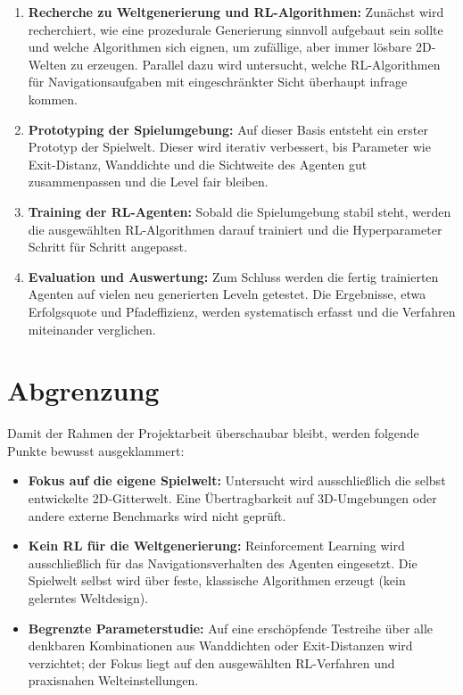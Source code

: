 \documentclass[
  a4paper,
  11pt,
  twoside,
  BCOR=8mm,           %
  headings=big,
  numbers=noenddot,
  listof=totoc,       %
  captions=tableheading,
]{scrreprt}
\begin{document}
\begin{enumerate}
    \item \textbf{Recherche zu Weltgenerierung und RL-Algorithmen:} Zunächst wird recherchiert, wie eine prozedurale Generierung sinnvoll aufgebaut sein sollte und welche Algorithmen sich eignen, um zufällige, aber immer lösbare 2D-Welten zu erzeugen. Parallel dazu wird untersucht, welche RL-Algorithmen für Navigationsaufgaben mit eingeschränkter Sicht überhaupt infrage kommen.
    \item \textbf{Prototyping der Spielumgebung:} Auf dieser Basis entsteht ein erster Prototyp der Spielwelt. Dieser wird iterativ verbessert, bis Parameter wie Exit-Distanz, Wanddichte und die Sichtweite des Agenten gut zusammenpassen und die Level fair bleiben.
    \item \textbf{Training der RL-Agenten:} Sobald die Spielumgebung stabil steht, werden die ausgewählten RL-Algorithmen darauf trainiert und die Hyperparameter Schritt für Schritt angepasst.
    \item \textbf{Evaluation und Auswertung:} Zum Schluss werden die fertig trainierten Agenten auf vielen neu generierten Leveln getestet. Die Ergebnisse, etwa Erfolgsquote und Pfadeffizienz, werden systematisch erfasst und die Verfahren miteinander verglichen.
\end{enumerate}

\section{Abgrenzung}
\label{sec:abgrenzung}

Damit der Rahmen der Projektarbeit überschaubar bleibt, werden folgende Punkte bewusst ausgeklammert:

\begin{itemize}
    \item \textbf{Fokus auf die eigene Spielwelt:} Untersucht wird ausschließlich die selbst entwickelte 2D-Gitterwelt. Eine Übertragbarkeit auf 3D-Umgebungen oder andere externe Benchmarks wird nicht geprüft.
    \item \textbf{Kein RL für die Weltgenerierung:} Reinforcement Learning wird ausschließlich für das Navigationsverhalten des Agenten eingesetzt. Die Spielwelt selbst wird über feste, klassische Algorithmen erzeugt (kein gelerntes Weltdesign).
    \item \textbf{Begrenzte Parameterstudie:} Auf eine erschöpfende Testreihe über alle denkbaren Kombinationen aus Wanddichten oder Exit-Distanzen wird verzichtet; der Fokus liegt auf den ausgewählten RL-Verfahren und praxisnahen Welteinstellungen.
\end{itemize}
\end{document}
